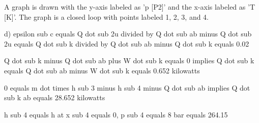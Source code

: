 A graph is drawn with the y-axis labeled as 'p [P2]' and the x-axis labeled as 'T [K]'. The graph is a closed loop with points labeled 1, 2, 3, and 4.

d) epsilon sub c equals Q dot sub 2u divided by Q dot sub ab minus Q dot sub 2u equals Q dot sub k divided by Q dot sub ab minus Q dot sub k equals 0.02

Q dot sub k minus Q dot sub ab plus W dot sub k equals 0 implies Q dot sub k equals Q dot sub ab minus W dot sub k equals 0.652 kilowatts

0 equals m dot times h sub 3 minus h sub 4 minus Q dot sub ab implies Q dot sub k ab equals 28.652 kilowatts

h sub 4 equals h at x sub 4 equals 0, p sub 4 equals 8 bar equals 264.15